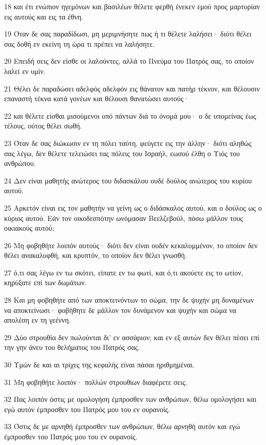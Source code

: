 \par 18 και έτι ενώπιον ηγεμόνων και βασιλέων θέλετε φερθή ένεκεν εμού προς μαρτυρίαν εις αυτούς και εις τα έθνη.
\par 19 Όταν δε σας παραδίδωσι, μη μεριμνήσητε πως ή τι θέλετε λαλήσει· διότι θέλει σας δοθή εν εκείνη τη ώρα τι πρέπει να λαλήσητε.
\par 20 Επειδή σεις δεν είσθε οι λαλούντες, αλλά το Πνεύμα του Πατρός σας, το οποίον λαλεί εν υμίν.
\par 21 Θέλει δε παραδώσει αδελφός αδελφόν εις θάνατον και πατήρ τέκνον, και θέλουσιν επαναστή τέκνα κατά γονέων και θέλουσι θανατώσει αυτούς·
\par 22 και θέλετε είσθαι μισούμενοι υπό πάντων διά το όνομά μου· ο δε υπομείνας έως τέλους, ούτος θέλει σωθή.
\par 23 Όταν δε σας διώκωσιν εν τη πόλει ταύτη, φεύγετε εις την άλλην· διότι αληθώς σας λέγω, δεν θέλετε τελειώσει τας πόλεις του Ισραήλ, εωσού έλθη ο Υιός του ανθρώπου.
\par 24 Δεν είναι μαθητής ανώτερος του διδασκάλου ουδέ δούλος ανώτερος του κυρίου αυτού.
\par 25 Αρκετόν είναι εις τον μαθητήν να γείνη ως ο διδάσκαλος αυτού, και ο δούλος ως ο κύριος αυτού. Εάν τον οικοδεσπότην ωνόμασαν Βεελζεβούλ, πόσω μάλλον τους οικιακούς αυτού;
\par 26 Μη φοβηθήτε λοιπόν αυτούς· διότι δεν είναι ουδέν κεκαλυμμένον, το οποίον δεν θέλει ανακαλυφθή, και κρυπτόν, το οποίον δεν θέλει γνωσθή.
\par 27 ό,τι σας λέγω εν τω σκότει, είπατε εν τω φωτί, και ό,τι ακούετε εις το ωτίον, κηρύξατε επί των δωμάτων.
\par 28 Και μη φοβηθήτε από των αποκτεινόντων το σώμα, την δε ψυχήν μη δυναμένων να αποκτείνωσι· φοβήθητε δε μάλλον τον δυνάμενον και ψυχήν και σώμα να απολέση εν τη γεέννη.
\par 29 Δύο στρουθία δεν πωλούνται δι' εν ασσάριον; και εν εξ αυτών δεν θέλει πέσει επί την γην άνευ του θελήματος του Πατρός σας.
\par 30 Υμών δε και αι τρίχες της κεφαλής είναι πάσαι ηριθμημέναι.
\par 31 Μη φοβηθήτε λοιπόν· πολλών στρουθίων διαφέρετε σεις.
\par 32 Πας λοιπόν όστις με ομολογήση έμπροσθεν των ανθρώπων, θέλω ομολογήσει και εγώ αυτόν έμπροσθεν του Πατρός μου του εν ουρανοίς.
\par 33 Όστις δε με αρνηθή έμπροσθεν των ανθρώπων, θέλω αρνηθή αυτόν και εγώ έμπροσθεν του Πατρός μου του εν ουρανοίς.
